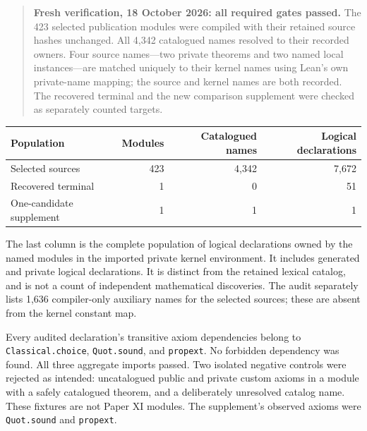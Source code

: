 \begin{quote}
\textbf{Fresh verification, 18 October 2026: all required gates passed.}
The 423 selected publication modules were compiled with their retained source
hashes unchanged. All 4,342 catalogued names resolved to their recorded owners.
Four source names---two private theorems and two named local instances---are
matched uniquely to their kernel names using Lean's own private-name mapping;
the source and kernel names are both recorded.
The recovered terminal and the new comparison supplement were checked as
separately counted targets.
\end{quote}

\begin{center}\small
\begin{tabular}{@{}lrrr@{}}
\toprule
Population & Modules & Catalogued names & Logical declarations\\
\midrule
Selected sources & 423 & 4,342 & 7,672\\
Recovered terminal & 1 & 0 & 51\\
One-candidate supplement & 1 & 1 & 1\\
\bottomrule
\end{tabular}
\end{center}

The last column is the complete population of logical declarations owned by
the named modules in the imported private kernel environment. It includes
generated and private logical declarations. It is distinct from the retained
lexical catalog, and is not a count of independent mathematical discoveries.
The audit separately lists 1,636 compiler-only auxiliary names for
the selected sources; these are absent from the kernel constant map.

Every audited declaration's transitive axiom dependencies belong to
\texttt{Classical.choice}, \texttt{Quot.sound}, and \texttt{propext}.
No forbidden dependency was found. All three aggregate imports passed.
Two isolated negative controls were rejected as intended: uncatalogued public
and private custom axioms in a module with a safely catalogued theorem, and a
deliberately unresolved catalog name. These fixtures are not Paper XI modules.
The supplement's observed axioms were \texttt{Quot.sound} and \texttt{propext}.

